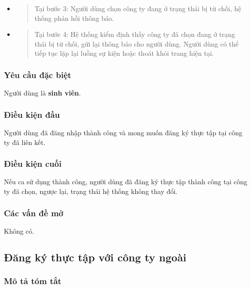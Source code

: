\documentclass[./../main.tex]{subfiles}
\begin{document}
\begin{itemize}
\item
  \begin{quote}
  Tại bước 3: Người dùng chọn công ty đang ở trạng thái bị từ chối, hệ
  thống phản hồi thông báo.
  \end{quote}
\item
  \begin{quote}
  Tại bước 4: Hệ thống kiểm định thấy công ty đã chọn đang ở trạng thái
  bị từ chối, gửi lại thông báo cho người dùng. Người dùng có thể tiếp
  tục lặp lại luồng sự kiện hoặc thoát khỏi trang hiện tại.
  \end{quote}
\end{itemize}

\subsubsection*{Yêu cầu đặc biệt}

Người dùng là \textbf{sinh viên}.

\subsubsection*{Điều kiện đầu}

Người dùng đã đăng nhập thành công và mong muốn đăng ký thực tập tại
công ty đã liên kết.

\subsubsection*{Điều kiện cuối}

Nếu ca sử dụng thành công, người dùng đã đăng ký thực tập thành công tại
công ty đã chọn, ngược lại, trạng thái hệ thống không thay đổi.

\subsubsection*{Các vấn đề mở}

Không có.

\subsection{Đăng ký thực tập với công ty ngoài}

\subsubsection*{Mô tả tóm tắt}
\end{document}
